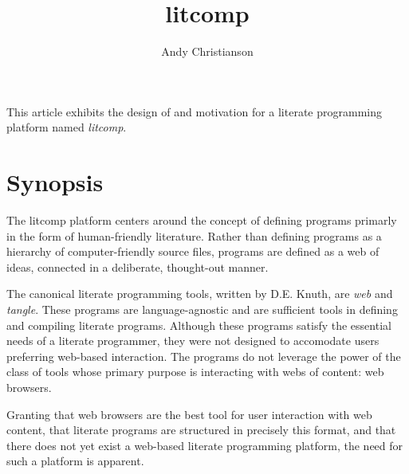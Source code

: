 \setlength{\topmargin}{-.5in}
\setlength{\textheight}{9in}
\setlength{\oddsidemargin}{.125in}
\setlength{\textwidth}{6.25in}

\title{litcomp}
\author{Andy Christianson}
\renewcommand{\today}{March 13, 2011}
\maketitle

This article exhibits the design of and motivation for a literate
programming platform named {\em litcomp}.

\section {Synopsis}

The litcomp platform centers around the concept of defining programs primarly
in the form of human-friendly literature. Rather than defining programs
as a hierarchy of computer-friendly source files, programs are defined
as a web of ideas, connected in a deliberate, thought-out manner.

The canonical literate programming tools, written by D.E. Knuth, are
{\em web} and {\em tangle}. These programs are language-agnostic and are
sufficient tools in defining and compiling literate programs. Although
these programs satisfy the essential needs of a literate programmer,
they were not designed to accomodate users preferring web-based
interaction. The programs do not leverage the power of the class of tools
whose primary purpose is interacting with webs of content: web browsers.

Granting that web browsers are the best tool for user interaction with
web content, that literate programs are structured in precisely this
format, and that there does not yet exist a web-based literate programming
platform, the need for such a platform is apparent.


